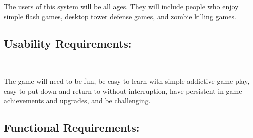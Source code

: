 \documentclass[oneside]{article}%
\begin{document}
The users of this system will be all ages. They will include people who enjoy simple flash
games, desktop tower defense games, and zombie killing games.

\subsection*{Usability Requirements:}
\

The game will need to be fun, be easy to learn with simple addictive
game play, easy to put down and return to without interruption, have persistent in-game
achievements and upgrades, and be challenging.

\subsection*{Functional Requirements:}
\end{document}
